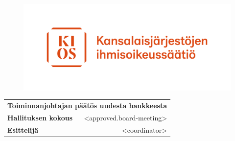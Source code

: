 \documentclass[twoside,a4paper]{article}
\begin{document}
    \setcounter{page}{0}
	\begin{figure}
		\includegraphics[trim = 10mm 0mm 0mm 70mm,scale=0.25]{logo.pdf}
	\end{figure}
	
	\hfill
	\begin{tabular}{l r}
		\multicolumn{2}{c}{
		    \textbf{Toiminnanjohtajan päätös uudesta hankkeesta}
		}\\ 
		\textbf{Hallituksen kokous} & <approved.board-meeting>\\  
		\textbf{Esittelijä} & <coordinator>\\ 
	\end{tabular}
	
\end{document}

